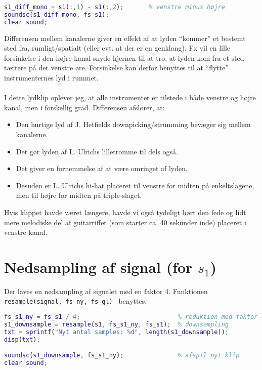 \documentclass[a4paper]{report}
\begin{document}
\begin{lstlisting}[language=Matlab, style=Matlab-editor]
s1_diff_mono = s1(:,1) - s1(:,2);       % venstre minus højre
soundsc(s1_diff_mono, fs_s1);
clear sound;
\end{lstlisting}
\begin{par}

Differensen mellem kanalerne giver en effekt af at lyden ``kommer'' et
bestemt sted fra, rumligt/spatialt (eller evt. at der er en genklang).
Fx vil en lille forsinkelse i den højre kanal snyde hjernen til at tro, at
lyden kom fra et sted tættere på det venstre øre.
Forsinkelse kan derfor benyttes til at ``flytte'' instrumenternes lyd i
rummet.\\\\
I dette lydklip oplever jeg, at alle instrumenter er tilstede i både
venstre og højre kanal, men i forskellig grad. Differensen afslører, at:
\begin{itemize}
\item Den hurtige lyd af J. Hetfields downpicking/strumming bevæger sig
mellem kanalerne.
\item Det gør lyden af L. Ulrichs lilletromme til dels også.
\item Det giver en fornemmelse af at være omringet af lyden.
\item Desuden er L. Ulrichs hi-hat placeret til venstre for midten på enkeltslagene,
men til højre for midten på triple-slaget.
\end{itemize}
Hvis klippet havde været længere, havde vi også tydeligt hørt den fede og
lidt mere melodiske del af guitarriffet (som starter ca. 40 sekunder
inde) placeret i venstre kanal.\\

\end{par} 



\section{Nedsampling af signal (for $s_1$)}

        \begin{par}

Der laves en nedsampling af signalet med en faktor 4.
Funktionen \texttt{resample(signal, fs\_ny, fs\_gl)}~ benyttes.\\

\end{par} 

\begin{lstlisting}[language=Matlab, style=Matlab-editor]
fs_s1_ny = fs_s1 / 4;                           % reduktion med faktor 4
s1_downsample = resample(s1, fs_s1_ny, fs_s1);  % downsampling
txt = sprintf("Nyt antal samples: %d", length(s1_downsample));
disp(txt);

soundsc(s1_downsample, fs_s1_ny);               % afspil nyt klip
clear sound;
\end{lstlisting}
\end{document}
